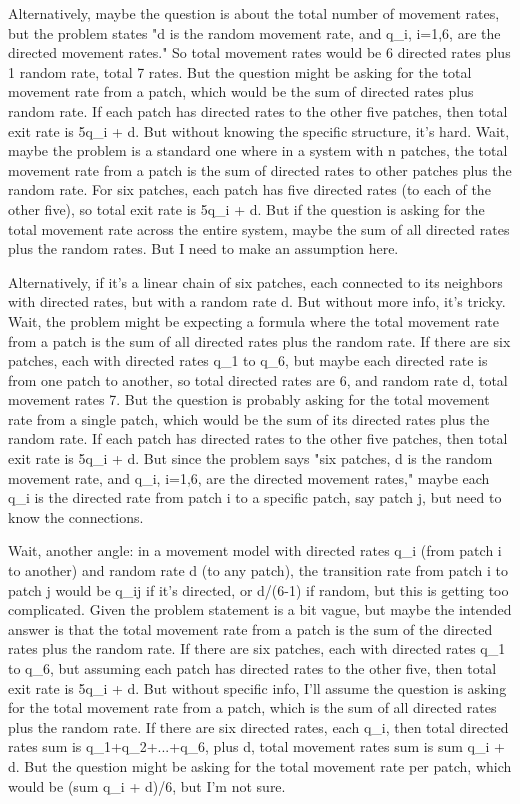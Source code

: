 Alternatively, maybe the question is about the total number of movement rates, but the problem states "d is the random movement rate, and q_i, i=1,6, are the directed movement rates." So total movement rates would be 6 directed rates plus 1 random rate, total 7 rates. But the question might be asking for the total movement rate from a patch, which would be the sum of directed rates plus random rate. If each patch has directed rates to the other five patches, then total exit rate is 5q_i + d. But without knowing the specific structure, it's hard. Wait, maybe the problem is a standard one where in a system with n patches, the total movement rate from a patch is the sum of directed rates to other patches plus the random rate. For six patches, each patch has five directed rates (to each of the other five), so total exit rate is 5q_i + d. But if the question is asking for the total movement rate across the entire system, maybe the sum of all directed rates plus the random rates. But I need to make an assumption here. 

Alternatively, if it's a linear chain of six patches, each connected to its neighbors with directed rates, but with a random rate d. But without more info, it's tricky. Wait, the problem might be expecting a formula where the total movement rate from a patch is the sum of all directed rates plus the random rate. If there are six patches, each with directed rates q_1 to q_6, but maybe each directed rate is from one patch to another, so total directed rates are 6, and random rate d, total movement rates 7. But the question is probably asking for the total movement rate from a single patch, which would be the sum of its directed rates plus the random rate. If each patch has directed rates to the other five patches, then total exit rate is 5q_i + d. But since the problem says "six patches, d is the random movement rate, and q_i, i=1,6, are the directed movement rates," maybe each q_i is the directed rate from patch i to a specific patch, say patch j, but need to know the connections. 

Wait, another angle: in a movement model with directed rates q_i (from patch i to another) and random rate d (to any patch), the transition rate from patch i to patch j would be q_ij if it's directed, or d/(6-1) if random, but this is getting too complicated. Given the problem statement is a bit vague, but maybe the intended answer is that the total movement rate from a patch is the sum of the directed rates plus the random rate. If there are six patches, each with directed rates q_1 to q_6, but assuming each patch has directed rates to the other five, then total exit rate is 5q_i + d. But without specific info, I'll assume the question is asking for the total movement rate from a patch, which is the sum of all directed rates plus the random rate. If there are six directed rates, each q_i, then total directed rates sum is q_1+q_2+...+q_6, plus d, total movement rates sum is sum q_i + d. But the question might be asking for the total movement rate per patch, which would be (sum q_i + d)/6, but I'm not sure. 

